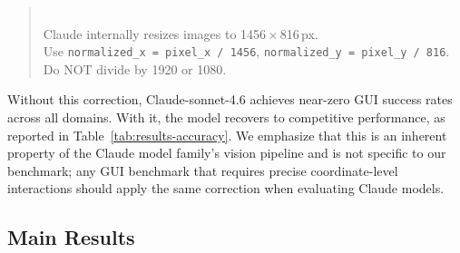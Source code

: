 \documentclass{article}
\begin{document}
\begin{quote}\small{} \\
Claude internally resizes images to 1456\,$\times$\,816\,px. \\
Use \texttt{normalized\_x = pixel\_x / 1456}, \texttt{normalized\_y = pixel\_y / 816}. \\
Do NOT divide by 1920 or 1080.
\end{quote}

Without this correction, Claude-sonnet-4.6 achieves near-zero GUI success rates across all domains.
With it, the model recovers to competitive performance, as reported in Table~\ref{tab:results-accuracy}.
We emphasize that this is an inherent property of the Claude model family's vision pipeline
and is not specific to our benchmark; any GUI benchmark that requires precise coordinate-level
interactions should apply the same correction when evaluating Claude models.

\subsection{Main Results}
\label{sec:main-results}
\end{document}
